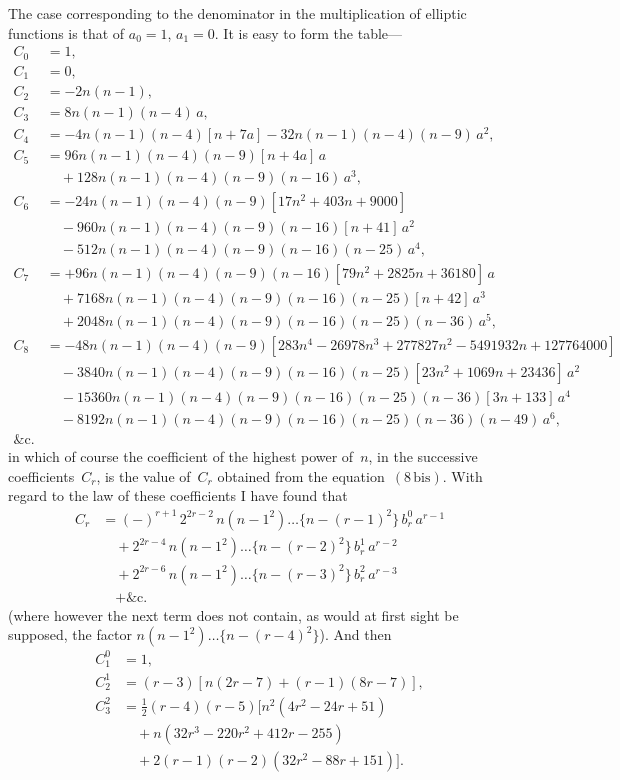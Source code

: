 \documentclass[11pt,a4paper]{article}
\begin{document}
\newpage
The case corresponding to the denominator in the multiplication of elliptic functions is that of $a_0 = 1$, $a_1 = 0$. It is easy to form the table---
\begin{align*}
C_0 &= 1,\\
C_1 &= 0,\\
C_2 &= -2n(n-1),\\
C_3 &= 8n(n-1)(n-4)\,a,\\
C_4 &= -4n(n-1)(n-4)[n+7a] - 32n(n-1)(n-4)(n-9)\,a^2,\\
C_5 &= 96n(n-1)(n-4)(n-9)[n+4a]\,a \\
  &\quad+ 128n(n-1)(n-4)(n-9)(n-16)\,a^3,\\
C_6 &= -24n(n-1)(n-4)(n-9)[17n^2 + 403n + 9000] \\
  &\quad- 960n(n-1)(n-4)(n-9)(n-16)[n+41]\,a^2 \\
  &\quad- 512n(n-1)(n-4)(n-9)(n-16)(n-25)\,a^4,\\
C_7 &= +96n(n-1)(n-4)(n-9)(n-16)[79n^2 + 2825n + 36180]\,a \\
  &\quad+ 7168n(n-1)(n-4)(n-9)(n-16)(n-25)[n+42]\,a^3 \\
  &\quad+ 2048n(n-1)(n-4)(n-9)(n-16)(n-25)(n-36)\,a^5,\\
C_8 &= -48n(n-1)(n-4)(n-9)[283n^4 - 26978n^3 + 277827n^2 - 5491932n + 127764000] \\
  &\quad- 3840n(n-1)(n-4)(n-9)(n-16)(n-25)[23n^2 + 1069n + 23436]\,a^2 \\
  &\quad- 15360n(n-1)(n-4)(n-9)(n-16)(n-25)(n-36)[3n+133]\,a^4 \\
  &\quad- 8192n(n-1)(n-4)(n-9)(n-16)(n-25)(n-36)(n-49)\,a^6,\\
\&\text{c.}
\end{align*}
in which of course the coefficient of the highest power of~$n$, in the successive coefficients~$C_r$, is the value of~$C_r$ obtained from the equation~$(8\,\text{bis})$. With regard to the law of these coefficients I have found that
\begin{align*}
C_r &= (-)^{r+1}\,2^{2r-2}\,n(n-1^2)\ldots\{n-(r-1)^2\}\,b_r^0\,a^{r-1} \\
  &\quad+ 2^{2r-4}\,n(n-1^2)\ldots\{n-(r-2)^2\}\,b_r^1\,a^{r-2} \\
  &\quad+ 2^{2r-6}\,n(n-1^2)\ldots\{n-(r-3)^2\}\,b_r^2\,a^{r-3} \\
  &\quad+ \text{\&c.}
\end{align*}
(where however the next term does not contain, as would at first sight be supposed, the factor $n(n-1^2)\ldots\{n-(r-4)^2\}$). And then
\begin{align*}
C_1^0 &= 1,\\
C_2^1 &= (r-3)[n(2r-7) + (r-1)(8r-7)],\\
C_3^2 &= \tfrac{1}{2}(r-4)(r-5)[n^2(4r^2-24r+51) \\
  &\quad+ n(32r^3-220r^2+412r-255) \\
  &\quad+ 2(r-1)(r-2)(32r^2-88r+151)].
\end{align*}
\end{document}

